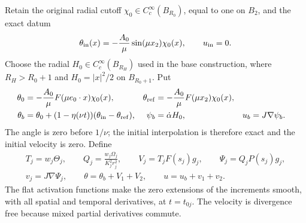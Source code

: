 Retain the original radial cutoff $\chi_0\in C_c^\infty(B_{R_0})$,
equal to one on $B_2$, and the exact datum
\[
 \theta_{\rm in}(x)=-\frac{A_0}{\mu}\sin(\mu x_2)\chi_0(x),
 \qquad u_{\rm in}=0.
\]
Choose the radial $H_0\in C_c^\infty(B_{R_H})$ used in the
base construction, where $R_H>R_0+1$ and
$H_0=|x|^2/2$ on $B_{R_0+1}$. Put
\begin{align}
 \theta_0&=-\frac{A_0}{\mu}F(\mu e_0\cdot x)\chi_0(x),
 &\theta_{\rm ref}&=-\frac{A_0}{\mu}F(\mu x_2)\chi_0(x),\nonumber\\
 \theta_b&=\theta_0+(1-\eta(\nu t))
                          (\theta_{\rm in}-\theta_{\rm ref}),
 &\psi_b&=\dot\alpha H_0,&u_b&=J\nabla\psi_b.
 \label{ms:base}
\end{align}
The angle is zero before $1/\nu$; the initial interpolation is
therefore exact and the initial velocity is zero. Define
\begin{equation}\label{ms:fields}
 \begin{gathered}
 T_j=w_j\Theta_j,\qquad Q_j=\frac{w_j\Omega_j}{K_j^2r_j^2},
 \qquad V_j=T_jF(s_j)g_j,\qquad\Psi_j=Q_jP(s_j)g_j,\\
 v_j=J\nabla\Psi_j,\qquad
 \theta=\theta_b+V_1+V_2,\qquad u=u_b+v_1+v_2.
 \end{gathered}
\end{equation}
The flat activation functions make the zero extensions of the
increments smooth, with all spatial and temporal derivatives, at
$t=t_{0j}$. The velocity is divergence free because mixed partial
derivatives commute.

